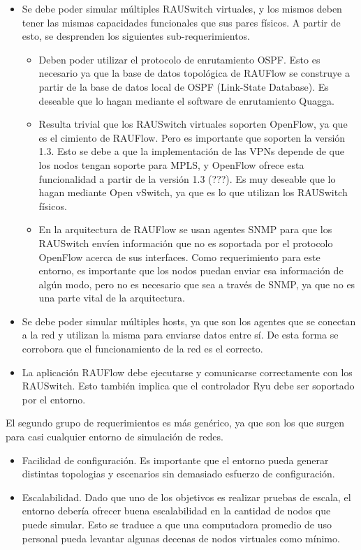\begin{itemize}
	\item Se debe poder simular múltiples RAUSwitch virtuales, y los mismos deben tener las mismas capacidades funcionales que sus pares físicos. A partir de esto, se desprenden los siguientes sub-requerimientos.
	\begin{itemize}
		\item Deben poder utilizar el protocolo de enrutamiento OSPF. Esto es necesario ya que la base de datos topológica de RAUFlow se construye a partir de la base de datos local de OSPF (Link-State Database).  Es deseable que lo hagan mediante el software de enrutamiento Quagga.
		\item Resulta trivial que los RAUSwitch virtuales soporten OpenFlow, ya que es el cimiento de RAUFlow. Pero es importante que soporten la versión 1.3. Esto se debe a que la implementación de las VPNs depende de que los nodos tengan soporte para MPLS, y OpenFlow ofrece esta funcionalidad a partir de la versión 1.3 (???). Es muy deseable que lo hagan mediante Open vSwitch, ya que es lo que utilizan los RAUSwitch físicos.
		\item En la arquitectura de RAUFlow se usan agentes SNMP para que los RAUSwitch envíen información que no es soportada por el protocolo OpenFlow acerca de sus interfaces. Como requerimiento para este entorno, es importante que los nodos puedan enviar esa información de algún modo, pero no es necesario que sea a través de SNMP, ya que no es una parte vital de la arquitectura.
	\end{itemize}
	\item Se debe poder simular múltiples hosts, ya que son los agentes que se conectan a la red y utilizan la misma para enviarse datos entre sí. De esta forma se corrobora que el funcionamiento de la red es el correcto.
	\item La aplicación RAUFlow debe ejecutarse y comunicarse correctamente con los RAUSwitch. Esto también implica que el controlador Ryu debe ser soportado por el entorno.
\end{itemize}

El segundo grupo de requerimientos es más genérico, ya que son los que surgen para casi cualquier entorno de simulación de redes.

\begin{itemize} 
	\item Facilidad de configuración. Es importante que el entorno pueda generar distintas topologias y escenarios sin demasiado esfuerzo de configuración.
	\item Escalabilidad. Dado que uno de los objetivos es realizar pruebas de escala, el entorno debería ofrecer buena escalabilidad en la cantidad de nodos que puede simular. Esto se traduce a que una computadora promedio de uso personal pueda levantar algunas decenas de nodos virtuales como mínimo.
\end{itemize}

